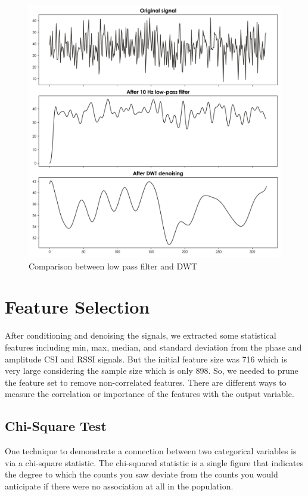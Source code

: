 \begin{figure}[H]
\centering
\includegraphics[width=1.0\textwidth]{./figure/chap 4/lpf_vsdwt.png}
\caption{Comparison between low pass filter and DWT}
\label{Fig 4.15}
\end{figure}

\section{Feature Selection}
After conditioning and denoising the signals, we extracted some statistical features including min, max, median, and standard deviation from the phase and amplitude CSI and RSSI signals. But the initial feature size was 716 which is very large considering the sample size which is only 898. So, we needed to prune the feature set to remove non-correlated features. There are different ways to measure the correlation or importance of the features with the output variable.

\subsection{Chi-Square Test \cite{chisquare}} 
One technique to demonstrate a connection between two categorical variables is via a chi-square statistic. The chi-squared statistic is a single figure that indicates the degree to which the counts you saw deviate from the counts you would anticipate if there were no association at all in the population. 

